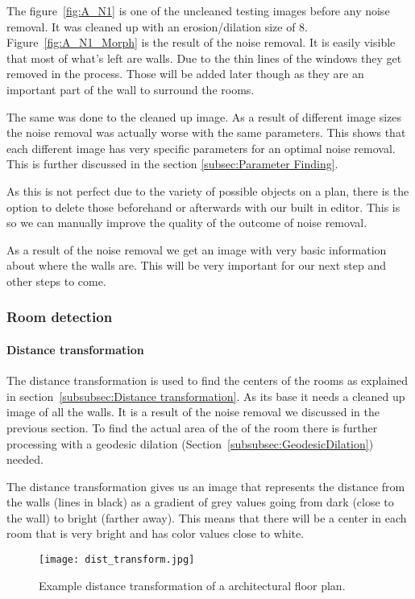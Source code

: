 The figure~\ref{fig:A_N1} is one of the uncleaned testing images before any noise removal. It was cleaned up with an erosion/dilation size of 8. Figure~\ref{fig:A_N1_Morph} is the result of the noise removal. It is easily visible that most of what's left are walls. Due to the thin lines of the windows they get removed in the process. Those will be added later though as they are an important part of the wall to surround the rooms.

The same was done to the cleaned up image. As a result of different image sizes the noise removal was actually worse with the same parameters. This shows that each different image has very specific parameters for an optimal noise removal. This is further discussed in the section \ref{subsec:Parameter Finding}.

As this is not perfect due to the variety of possible objects on a plan, there is the option to delete those beforehand or afterwards with our built in editor. This is so we can manually improve the quality of the outcome of noise removal.

As a result of the noise removal we get an image with very basic information about where the walls are. This will be very important for our next step and other steps to come.


\subsubsection{Room detection}
\paragraph{Distance transformation}
The distance transformation is used to find the centers of the rooms as explained in section~\ref{subsubsec:Distance transformation}. As its base it needs a cleaned up image of all the walls. It is a result of the noise removal we discussed in the previous section. To find the actual area of the of the room there is further processing with a geodesic dilation (Section~\ref{subsubsec:GeodesicDilation}) needed.

The distance transformation gives us an image that represents the distance from the walls (lines in black) as a gradient of grey values going from dark (close to the wall) to bright (farther away). This means that there will be a center in each room that is very bright and has color values close to white.

\begin{figure}[H]
	\centering
	\texttt{[image: dist\_transform.jpg]}
	\caption{Example distance transformation of a architectural floor plan.}
	\label{fig:dist_transform}
\end{figure}

